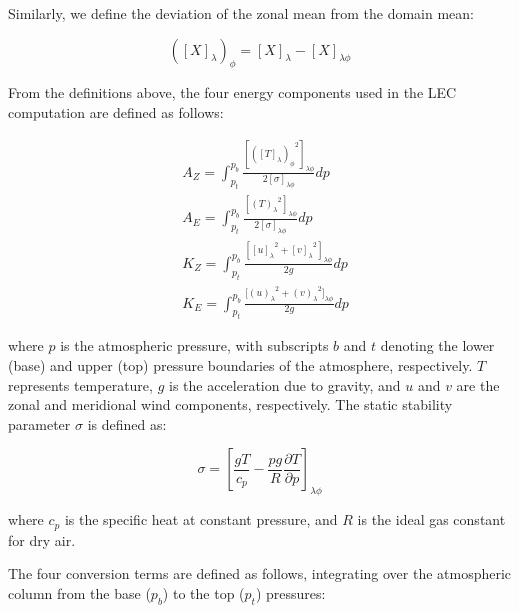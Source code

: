 \documentclass[pdflatex,sn-chicago]{sn-jnl}%
\theoremstyle{plain}
\theoremstyle{definition}
\theoremstyle{remark}
\theoremstyle{definition}
\begin{document}
Similarly, we define the deviation of the zonal mean from the domain mean:

\begin{equation}
    ([X]_\lambda)_\phi = [X]_\lambda - [X]_{\lambda\phi}
\end{equation}

From the definitions above, the four energy components used in the LEC computation are defined as follows:

\begin{align}
   &A_Z = \int_{p_t}^{p_b} \frac{[{([T]_\lambda)_\phi}^{2}]_{\lambda \phi}}  {2[\sigma]_{\lambda \phi}} dp \label{eq:AZ} \\
   &A_E = \int_{p_t}^{p_b} \frac{[{(T)_\lambda}^{2}]_{\lambda \phi}}  {2[\sigma]_{\lambda \phi}} dp \label{eq:AE} \\
   &K_Z =  \int_{p_t}^{p_b} \frac{[{[u]_\lambda}^2 + {[v]_\lambda}^2]_{\lambda \phi}}{2g} dp \label{eq:KZ} \\
   &K_E =  \int_{p_t}^{p_b} \frac{{[(u)_\lambda}^2 + {(v)_\lambda}^2]_{\lambda \phi}}{2g} dp \label{eq:KE}
\end{align}

where $p$ is the atmospheric pressure, with subscripts $b$ and $t$ denoting the lower (base) and upper (top) pressure boundaries of the atmosphere, respectively. $T$ represents temperature, $g$ is the acceleration due to gravity, and $u$ and $v$ are the zonal and meridional wind components, respectively. The static stability parameter $\sigma$ is defined as:


\begin{equation}
    \sigma = \left[\frac{gT}{c_p}-\frac{pg}{R}\frac{\partial T}{\partial p}\right]_{\lambda \phi}
\end{equation}

where $c_p$ is the specific heat at constant pressure, and $R$ is the ideal gas constant for dry air.


The four conversion terms are defined as follows, integrating over the atmospheric column from the base ($p_b$) to the top ($p_t$) pressures:
\end{document}
